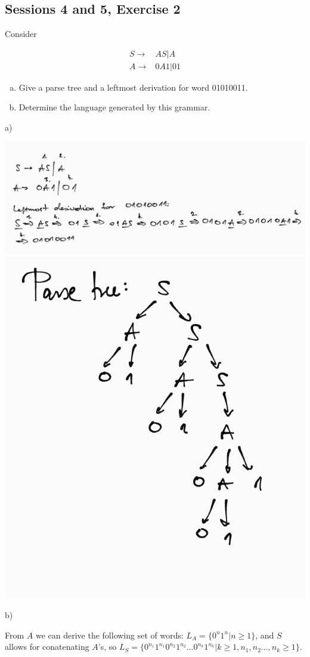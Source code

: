 \subsection{Sessions 4 and 5, Exercise 2}


Consider

\begin{align*}
S \rightarrow& AS|A\\
A \rightarrow& 0A1|01
\end{align*}

\begin{enumerate}[(a)]
\item Give a parse tree and a leftmost derivation for word 01010011.
\item Determine the language generated by this grammar.
\end{enumerate}


a)

\includegraphics[width=\linewidth]{04/4_2_a_1.png}
\includegraphics[width=\linewidth]{04/4_2_a_2.png}

b)

From $A$ we can derive the following set of words: $L_A = \{0^n1^n | n\geq{}1\}$, and $S$ allows for conatenating $A$'s, so $L_S=\{0^{n_1}1^{n_1}0^{n_2}1^{n_2}\dots0^{n_k}1^{n_k} | k\geq{}1, n_1,n_2\dots,n_k\geq{}1\}$.